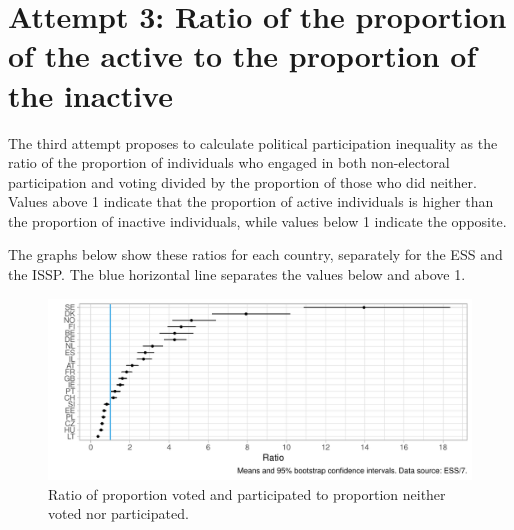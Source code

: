 \documentclass[12pt,]{article}
\begin{document}
\hypertarget{attempt-3-ratio-of-the-proportion-of-the-active-to-the-proportion-of-the-inactive}{%
\section{Attempt 3: Ratio of the proportion of the active to the proportion of the inactive}\label{attempt-3-ratio-of-the-proportion-of-the-active-to-the-proportion-of-the-inactive}}

The third attempt proposes to calculate political participation inequality as the ratio of the proportion of individuals who engaged in both non-electoral participation and voting divided by the proportion of those who did neither. Values above 1 indicate that the proportion of active individuals is higher than the proportion of inactive individuals, while values below 1 indicate the opposite.

The graphs below show these ratios for each country, separately for the ESS and the ISSP. The \textcolor{Cerulean}{blue} horizontal line separates the values below and above 1.

\begin{figure}[H]

{\centering \includegraphics{report_files/figure-latex/ess-ratio-all-1} 

}

\caption{Ratio of proportion voted and participated to proportion neither voted nor participated.}\label{fig:ess-ratio-all}
\end{figure}
\end{document}
